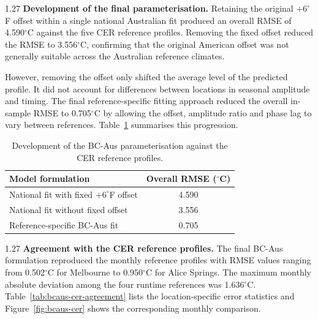 \documentclass[12pt,letterpaper]{article}
\begin{document}
\begin{spacing}{1.27}
\textbf{Development of the final parameterisation.} Retaining the original $+6^\circ$F offset within a single national Australian fit produced an overall RMSE of 4.590$^\circ$C against the five CER reference profiles. Removing the fixed offset reduced the RMSE to 3.556$^\circ$C, confirming that the original American offset was not generally suitable across the Australian reference climates.\par

\vspace{0.15in}

However, removing the offset only shifted the average level of the predicted profile. It did not account for differences between locations in seasonal amplitude and timing. The final reference-specific fitting approach reduced the overall in-sample RMSE to 0.705$^\circ$C by allowing the offset, amplitude ratio and phase lag to vary between references. Table~\ref{tab:bcaus-rmse-progression} summarises this progression.
\end{spacing}

\begin{table}[htbp]
\centering
\renewcommand{\thetable}{7}
\begin{tabular}{@{}lc@{}}
\toprule
\textbf{Model formulation} & \textbf{Overall RMSE ($^\circ$C)} \\
\midrule
National fit with fixed $+6^\circ$F offset & 4.590 \\
National fit without fixed offset & 3.556 \\
Reference-specific BC-Aus fit & 0.705 \\
\bottomrule
\end{tabular}
\caption{Development of the BC-Aus parameterisation against the CER reference profiles.}
\label{tab:bcaus-rmse-progression}
\end{table}

\begin{spacing}{1.27}
\textbf{Agreement with the CER reference profiles.} The final BC-Aus formulation reproduced the monthly reference profiles with RMSE values ranging from 0.502$^\circ$C for Melbourne to 0.950$^\circ$C for Alice Springs. The maximum monthly absolute deviation among the four runtime references was 1.636$^\circ$C. Table~\ref{tab:bcaus-cer-agreement} lists the location-specific error statistics and Figure~\ref{fig:bcaus-cer} shows the corresponding monthly comparison.
\end{spacing}
\end{document}
